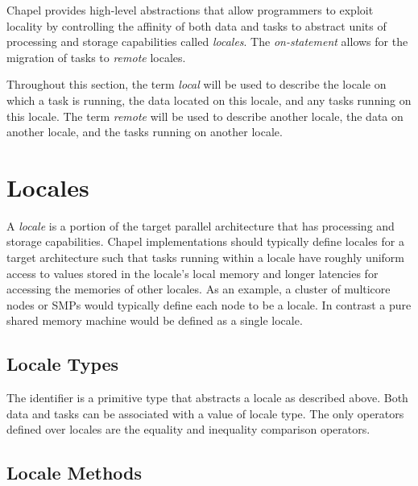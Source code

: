 \label{Locales_Chapter}

Chapel provides high-level abstractions that allow programmers to
exploit locality by controlling the affinity of both data and tasks to
abstract units of processing and storage capabilities
called \emph{locales}.  The \emph{on-statement} allows for the
migration of tasks to \emph{remote} locales.

Throughout this section, the term \emph{local} will be used to
describe the locale on which a task is running, the data located on
this locale, and any tasks running on this locale.  The
term \emph{remote} will be used to describe another locale, the data
on another locale, and the tasks running on another locale.

\section{Locales}
\label{Locales}

A \emph{locale} is a portion of the target parallel architecture that
has processing and storage capabilities.  Chapel implementations
should typically define locales for a target architecture such that
tasks running within a locale have roughly uniform access to values
stored in the locale's local memory and longer latencies for accessing
the memories of other locales.  As an example, a cluster of multicore
nodes or SMPs would typically define each node to be a locale.  In
contrast a pure shared memory machine would be defined as a single
locale.

\subsection{Locale Types}
\label{The_Locale_Type}

The identifier  is a primitive type that abstracts a
locale as described above.  Both data and tasks can be associated with
a value of locale type. The only operators defined over locales are
the equality and inequality comparison operators.

\subsection{Locale Methods}
\label{Locale_Methods}

